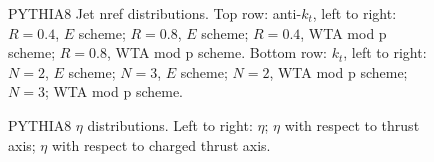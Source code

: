 \begin{figure}[H]
\hfill
{}\hfill
\caption{PYTHIA8 Jet nref distributions. Top row: anti-$k_t$, left to right: $R=0.4$, $E$ scheme; $R=0.8$, $E$ scheme; $R=0.4$, WTA mod p scheme; $R=0.8$, WTA mod p scheme. Bottom row: $k_t$, left to right: $N=2$, $E$ scheme; $N=3$, $E$ scheme; $N=2$, WTA mod p scheme; $N=3$; WTA mod p scheme.}  
\end{figure}

\begin{figure}[H]
\centering
{}\hfill
{}\hfill
{}\hfill
\caption{PYTHIA8 $\eta$ distributions. Left to right: $\eta$; $\eta$ with respect to thrust axis; $\eta$ with respect to charged thrust axis.}
\end{figure}

